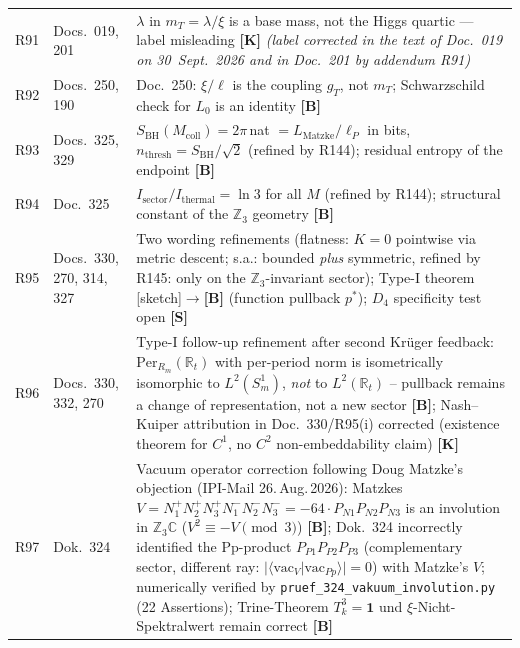 \begin{longtable}{@{}p{0.9cm}p{3.1cm}p{10.2cm}@{}}
R91 & Docs.~019, 201 & $\lambda$ in $m_T=\lambda/\xi$ is a base mass, not the Higgs quartic --- label misleading \textbf{[K]} \emph{(label corrected in the text of Doc.~019 on 30~Sept.~2026 and in Doc.~201 by addendum R91)} \\
R92 & Docs.~250, 190 & Doc.~250: $\xi/\ell$ is the coupling $g_T$, not $m_T$; Schwarzschild check for $L_0$ is an identity \textbf{[B]} \\
R93 & Docs.~325, 329 & $S_\mathrm{BH}(M_\mathrm{coll}) = 2\pi$\,nat $= L_\mathrm{Matzke}/\ell_P$ in bits, $n_\mathrm{thresh} = S_\mathrm{BH}/\sqrt{2}$ (refined by R144); residual entropy of the endpoint \textbf{[B]} \\
R94 & Doc.~325 & $I_\mathrm{sector}/I_\mathrm{thermal} = \ln 3$ for all $M$ (refined by R144); structural constant of the $\mathbb{Z}_3$ geometry \textbf{[B]} \\
R95 & Docs.~330, 270, 314, 327 & Two wording refinements (flatness: $K{=}0$ pointwise via metric descent; s.a.: bounded \emph{plus} symmetric, refined by R145: only on the $\mathbb{Z}_3$-invariant sector); Type-I theorem [sketch]$\to$\textbf{[B]} (function pullback $p^*$); $D_4$ specificity test open \textbf{[S]} \\
R96 & Docs.~330, 332, 270 & Type-I follow-up refinement after second Krüger feedback: $\mathrm{Per}_{R_m}(\mathbb{R}_t)$ with per-period norm is isometrically isomorphic to $L^2(S^1_m)$, \emph{not} to $L^2(\mathbb{R}_t)$ -- pullback remains a change of representation, not a new sector \textbf{[B]}; Nash--Kuiper attribution in Doc.~330/R95(i) corrected (existence theorem for $C^1$, no $C^2$ non-embeddability claim) \textbf{[K]} \\
R97 & Dok.~324 & Vacuum operator correction following Doug Matzke's objection (IPI-Mail 26.\,Aug.\,2026): Matzkes $V = N_1^+N_2^+N_3^+N_1^-N_2^-N_3^- = -64\cdot P_{N1}P_{N2}P_{N3}$ is an involution in $\mathbb{Z}_3\mathbb{C}$ ($V^2 \equiv -V \pmod{3}$) \textbf{[B]}; Dok.~324 incorrectly identified the Pp-product $P_{P1}P_{P2}P_{P3}$ (complementary sector, different ray: $|\langle\mathrm{vac}_V|\mathrm{vac}_{Pp}\rangle|=0$) with Matzke's $V$; numerically verified by \texttt{pruef\_324\_vakuum\_involution.py} (22 Assertions); Trine-Theorem $T_k^3=\mathbf{1}$ und $\xi$-Nicht-Spektralwert remain correct \textbf{[B]} \\

\end{longtable}
